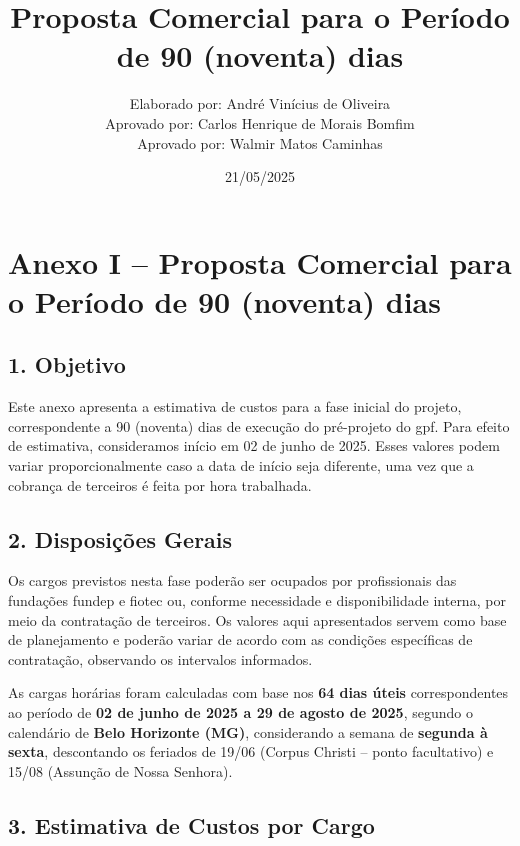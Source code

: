 \documentclass[12pt,a4paper]{report}
\title{Proposta Comercial para o Período de 90 (noventa) dias}
\author{
  Elaborado por: André Vinícius de Oliveira\\
  Aprovado por: Carlos Henrique de Morais Bomfim\\
  Aprovado por: Walmir Matos Caminhas
}
\date{21/05/2025}
\begin{document}
\chapter*{Anexo I – Proposta Comercial para o Período de 90 (noventa) dias}

\section*{1. Objetivo}

Este anexo apresenta a estimativa de custos para a fase inicial do projeto, correspondente a 90 (noventa) dias de execução do pré-projeto do \gls{gpf}. Para efeito de estimativa, consideramos início em 02 de junho de 2025. Esses valores podem variar proporcionalmente caso a data de início seja diferente, uma vez que a cobrança de terceiros é feita por hora trabalhada.

\section*{2. Disposições Gerais}

Os cargos previstos nesta fase poderão ser ocupados por profissionais das fundações \gls{fundep} e \gls{fiotec} ou, conforme necessidade e disponibilidade interna, por meio da contratação de terceiros. Os valores aqui apresentados servem como base de planejamento e poderão variar de acordo com as condições específicas de contratação, observando os intervalos informados.

As cargas horárias foram calculadas com base nos \textbf{64 dias úteis} correspondentes ao período de \textbf{02 de junho de 2025 a 29 de agosto de 2025}, segundo o calendário de \textbf{Belo Horizonte (MG)}, considerando a semana de \textbf{segunda à sexta}, descontando os feriados de 19/06 (Corpus Christi – ponto facultativo) e 15/08 (Assunção de Nossa Senhora).

\section*{3. Estimativa de Custos por Cargo}
\end{document}
